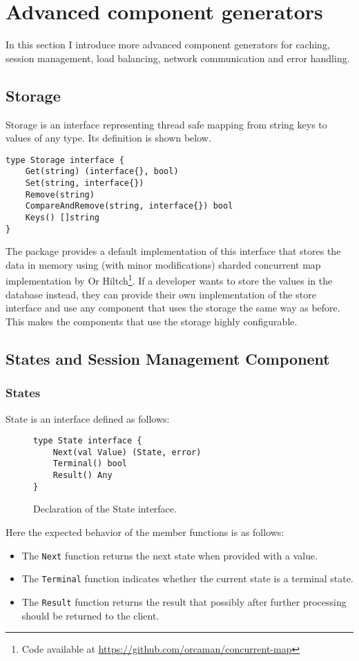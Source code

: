 \section{Advanced component generators}
\label{sec:impl2}
In this section I introduce more advanced component generators for caching,
session management, load balancing, network communication and error handling.

\subsection{Storage}
Storage is an interface representing thread safe mapping from string keys
to values of any type. Its definition is shown below.
\begin{lstlisting}
type Storage interface {
    Get(string) (interface{}, bool)
    Set(string, interface{})
    Remove(string)
    CompareAndRemove(string, interface{}) bool
    Keys() []string
}
\end{lstlisting}
The package provides a default implementation of this interface that
stores the data in memory using (with minor modifications) sharded concurrent map implementation
by Or Hiltch\footnote{Code available at \url{https://github.com/orcaman/concurrent-map}}.
If a developer wants to store the values in the 
database instead, they can provide their own implementation of the store interface
and use any component that uses the storage the same way as before.
This makes the components that use the storage highly configurable.


\subsection{States and Session Management Component}
\subsubsection{States}
\label{sec:state}
State is an interface defined as follows:
\begin{figure}[h]
\centering
\begin{lstlisting}
type State interface {
    Next(val Value) (State, error)
    Terminal() bool
    Result() Any
}
\end{lstlisting}
\caption[scale=1.0]{Declaration of the State interface.}
\label{fig:State}
\end{figure}

Here the expected behavior of the member functions is as follows:
\begin{itemize}
	\item The \texttt{Next} function returns the next state when provided with a value.
	\item The \texttt{Terminal} function indicates whether the current state is a terminal state.
	\item The \texttt{Result} function returns the result that possibly after further 
		  processing should be returned to the client.
\end{itemize}

